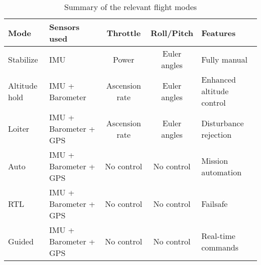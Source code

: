 
\begin{table}[htbp]
\centering
\begin{tabular}{lm{3.1cm}ccm{3cm}} 
	\hline
	\bfseries Mode	& \bfseries Sensors used	& \bfseries Throttle	&	\bfseries Roll/Pitch	&	\bfseries Features	\\
	\hline
	Stabilize		&	IMU					&	Power			&	Euler angles		&	Fully manual			\\
	Altitude hold	&	IMU + Barometer		&	Ascension rate	&	Euler angles		&	Enhanced altitude control\\
	Loiter			&	IMU + Barometer + GPS&	Ascension rate	&	Euler angles		&	Disturbance rejection	\\
	Auto			&	IMU + Barometer + GPS&	No control		&	No control			&	Mission automation		\\
	RTL				&	IMU + Barometer + GPS&	No control		&	No control			&	Failsafe				\\
	Guided			&	IMU + Barometer + GPS&	No control		&	No control			&	Real-time commands		\\
	\hline
\end{tabular}
\caption{Summary of the relevant flight modes}
\label{tab:modes}
\end{table}
